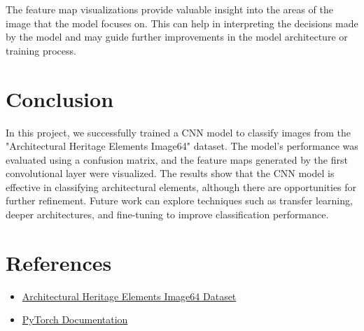\documentclass[12pt]{article}
\begin{document}
The feature map visualizations provide valuable insight into the areas of the image that the model focuses on. This can help in interpreting the decisions made by the model and may guide further improvements in the model architecture or training process.

\section{Conclusion}
In this project, we successfully trained a CNN model to classify images from the "Architectural Heritage Elements Image64" dataset. The model's performance was evaluated using a confusion matrix, and the feature maps generated by the first convolutional layer were visualized. The results show that the CNN model is effective in classifying architectural elements, although there are opportunities for further refinement. Future work can explore techniques such as transfer learning, deeper architectures, and fine-tuning to improve classification performance.

\section{References}
\begin{itemize}
    \item \href{https://www.kaggle.com/datasets/ikobzev/architectural-heritage-elements-image64-dataset}{Architectural Heritage Elements Image64 Dataset}
    \item \href{https://pytorch.org/docs/stable/index.html}{PyTorch Documentation}
\end{itemize}
\end{document}
